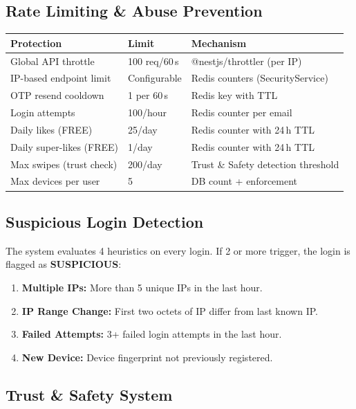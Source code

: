 \documentclass[a4paper,11pt]{article}
\begin{document}
\subsection{Rate Limiting \& Abuse Prevention}

\begin{longtable}{L{5cm} L{3cm} L{7cm}}
\toprule
\textbf{Protection} & \textbf{Limit} & \textbf{Mechanism} \\
\midrule
\endhead
Global API throttle & 100 req/60\,s & @nestjs/throttler (per IP) \\
IP-based endpoint limit & Configurable & Redis counters (SecurityService) \\
OTP resend cooldown & 1 per 60\,s & Redis key with TTL \\
Login attempts & 100/hour & Redis counter per email \\
Daily likes (FREE) & 25/day & Redis counter with 24\,h TTL \\
Daily super-likes (FREE) & 1/day & Redis counter with 24\,h TTL \\
Max swipes (trust check) & 200/day & Trust \& Safety detection threshold \\
Max devices per user & 5 & DB count + enforcement \\
\bottomrule
\end{longtable}

\subsection{Suspicious Login Detection}

The system evaluates 4 heuristics on every login. If 2 or more trigger, the login is flagged as \textbf{SUSPICIOUS}:

\begin{enumerate}[leftmargin=1.5em]
    \item \textbf{Multiple IPs:} More than 5 unique IPs in the last hour.
    \item \textbf{IP Range Change:} First two octets of IP differ from last known IP.
    \item \textbf{Failed Attempts:} 3+ failed login attempts in the last hour.
    \item \textbf{New Device:} Device fingerprint not previously registered.
\end{enumerate}

\subsection{Trust \& Safety System}
\end{document}
